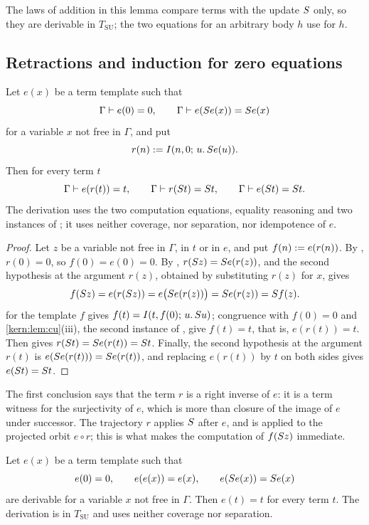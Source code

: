The laws of addition in this lemma compare terms with the update $S$
only, so they are derivable in $T_{\mathrm{SU}}$; the two equations for an
arbitrary body $h$ use  for $h$.

\subsection{Retractions and induction for zero equations}
\label{kern:sec:urretract}

\begin{proposition}
\label{kern:prop:rinv}
Let $e(x)$ be a term template such that
\[
 \Gamma\vdash e(0)=0,\qquad \Gamma\vdash e(S e(x))=S e(x)
\]
for a variable $x$ not free in $\Gamma$, and put
\[
 r(n)\mathrel{:=}I(n,0;\,u.\,S e(u)) .
\]
Then for every term $t$
\[
 \Gamma\vdash e(r(t))=t,\qquad
 \Gamma\vdash r(S t)=S t,\qquad
 \Gamma\vdash e(S t)=S t .
\]
The derivation uses the two computation equations, equality reasoning and
two instances of ; it uses neither coverage, nor separation,
nor idempotence of $e$.
\end{proposition}

\begin{proof}
Let $z$ be a variable not free in $\Gamma$, in $t$ or in $e$, and put
$f(n)\mathrel{:=} e(r(n))$.  By , $r(0)=0$, so $f(0)=e(0)=0$.  By
, $r(S z)=S e(r(z))$, and the second hypothesis at the
argument $r(z)$, obtained by substituting $r(z)$ for $x$, gives
\[
 f(S z)=e(r(S z))=e\bigl(S e(r(z))\bigr)=S e(r(z))=S f(z).
\]
 for the template $f$ gives
$f(t)=I(t,f(0);\,u.\,S u)$; congruence with $f(0)=0$ and
\cref{kern:lem:cu}(iii), the second instance of , give
$f(t)=t$, that is, $e(r(t))=t$.  Then  gives
$r(S t)=S e(r(t))=S t$.  Finally, the second hypothesis at the
argument $r(t)$ is $e(S e(r(t)))=S e(r(t))$, and replacing $e(r(t))$
by $t$ on both sides gives $e(S t)=S t$.
\end{proof}

The first conclusion says that the term $r$ is a right inverse of $e$: it
is a term witness for the surjectivity of $e$, which is more than closure of
the image of $e$ under successor.  The trajectory $r$ applies $S$ after
$e$, and  is applied to the projected orbit $e\circ r$; this is
what makes the computation of $f(S z)$ immediate.

\begin{lemma}
\label{kern:lem:rigid}
Let $e(x)$ be a term template such that
\[
 e(0)=0,\qquad e(e(x))=e(x),\qquad e(S e(x))=S e(x)
\]
are derivable for a variable $x$ not free in $\Gamma$.  Then $e(t)=t$ for
every term $t$.  The derivation is in $T_{\mathrm{SU}}$ and uses neither
coverage nor separation.
\end{lemma}

